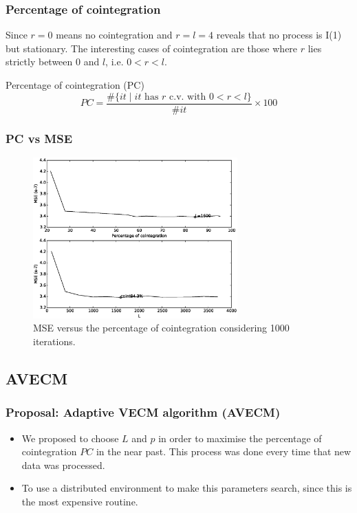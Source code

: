 \documentclass[compress,red]{beamer}
\begin{document}
\begin{frame}
\frametitle{Percentage of cointegration}
Since $r=0$ means no cointegration and $r=l=4$ reveals that no process is I(1) but stationary.
The interesting cases of cointegration are those where $r$ lies strictly
between $0$ and $l$, i.e. $0<r<l$.
\begin{block}{Percentage of cointegration (PC)}
{\color{blue}
\begin{equation*} \label{eq:pcoint}
PC = 
\frac{\#\{ it \mid \text{$it$ has $r$ c.v. with $0<r<l$}\}}
     {\#it}\times 100
\end{equation*}}
\end{block}
\end{frame}


\begin{frame}
\frametitle{PC vs MSE}
\begin{figure}[ht!]
  \centering
  \includegraphics[width=0.7\textwidth]{img/MSE-offset20520-p-2-freq-10s}
  \caption{MSE versus the percentage of cointegration considering 1000
  iterations. }
  \label{fig:cointvsmse}
\end{figure}
\end{frame}

\subsection{AVECM}
\begin{frame}
\frametitle{Proposal: Adaptive VECM algorithm (AVECM)}
\begin{itemize}
\item We proposed to choose $L$ and $p$ in order to maximise the percentage of
cointegration $PC$ in the near past. This process was done every time that new data was processed. 
\item To use a distributed environment to make this parameters search, since this is the most expensive routine.
\end{itemize}
\end{frame}
\end{document}
